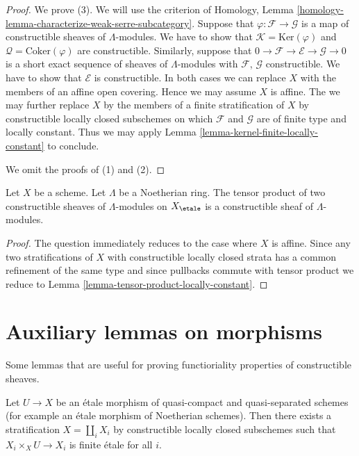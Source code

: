 \begin{proof}
We prove (3). We will use the criterion of
Homology, Lemma \ref{homology-lemma-characterize-weak-serre-subcategory}.
Suppose that $\varphi : \mathcal{F} \to \mathcal{G}$
is a map of constructible sheaves of $\Lambda$-modules.
We have to show that $\mathcal{K} = \text{Ker}(\varphi)$ and
$\mathcal{Q} = \text{Coker}(\varphi)$ are constructible. 
Similarly, suppose that
$0 \to \mathcal{F} \to \mathcal{E} \to \mathcal{G} \to 0$
is a short exact sequence of sheaves of $\Lambda$-modules
with $\mathcal{F}$, $\mathcal{G}$ constructible. We have to show
that $\mathcal{E}$ is constructible.
In both cases we can replace $X$ with the members of an
affine open covering. Hence we may assume $X$ is affine.
The we may further replace $X$ by the members of a finite
stratification of $X$ by constructible locally closed subschemes
on which $\mathcal{F}$ and $\mathcal{G}$ are of finite type and
locally constant. Thus we may apply
Lemma \ref{lemma-kernel-finite-locally-constant} to conclude.

\medskip\noindent
We omit the proofs of (1) and (2).
\end{proof}

\begin{lemma}
\label{lemma-tensor-product-constructible}
Let $X$ be a scheme. Let $\Lambda$ be a Noetherian ring.
The tensor product of two constructible sheaves of $\Lambda$-modules
on $X_\etale$ is a constructible sheaf of $\Lambda$-modules.
\end{lemma}

\begin{proof}
The question immediately reduces to the case where $X$ is affine.
Since any two stratifications of $X$ with constructible locally
closed strata has a common refinement of the same type and
since pullbacks commute with tensor product we reduce to
Lemma \ref{lemma-tensor-product-locally-constant}.
\end{proof}




\section{Auxiliary lemmas on morphisms}
\label{section-stratify-morphisms}

\noindent
Some lemmas that are useful for proving functioriality properties
of constructible sheaves.

\begin{lemma}
\label{lemma-etale-stratified-finite}
Let $U \to X$ be an \'etale morphism of quasi-compact and quasi-separated
schemes (for example an \'etale morphism of Noetherian schemes). Then there
exists a stratification $X = \coprod_i X_i$ by constructible locally closed
subschemes such that $X_i \times_X U \to X_i$ is finite \'etale for all $i$.
\end{lemma}

